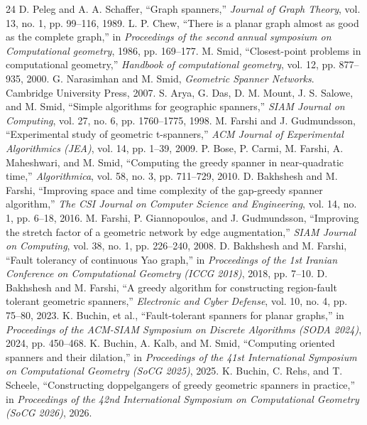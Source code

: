 \documentclass[journal]{IEEEtran}
\begin{document}
\begin{thebibliography}{24}
D. Peleg and A. A. Schaffer, ``Graph spanners,'' \textit{Journal of Graph Theory}, vol. 13, no. 1, pp. 99--116, 1989.
L. P. Chew, ``There is a planar graph almost as good as the complete graph,'' in \textit{Proceedings of the second annual symposium on Computational geometry}, 1986, pp. 169--177.
M. Smid, ``Closest-point problems in computational geometry,'' \textit{Handbook of computational geometry}, vol. 12, pp. 877--935, 2000.
G. Narasimhan and M. Smid, \textit{Geometric Spanner Networks}. Cambridge University Press, 2007.
S. Arya, G. Das, D. M. Mount, J. S. Salowe, and M. Smid, ``Simple algorithms for geographic spanners,'' \textit{SIAM Journal on Computing}, vol. 27, no. 6, pp. 1760--1775, 1998.
M. Farshi and J. Gudmundsson, ``Experimental study of geometric t-spanners,'' \textit{ACM Journal of Experimental Algorithmics (JEA)}, vol. 14, pp. 1--39, 2009.
P. Bose, P. Carmi, M. Farshi, A. Maheshwari, and M. Smid, ``Computing the greedy spanner in near-quadratic time,'' \textit{Algorithmica}, vol. 58, no. 3, pp. 711--729, 2010.
D. Bakhshesh and M. Farshi, ``Improving space and time complexity of the gap-greedy spanner algorithm,'' \textit{The CSI Journal on Computer Science and Engineering}, vol. 14, no. 1, pp. 6--18, 2016.
M. Farshi, P. Giannopoulos, and J. Gudmundsson, ``Improving the stretch factor of a geometric network by edge augmentation,'' \textit{SIAM Journal on Computing}, vol. 38, no. 1, pp. 226--240, 2008.
D. Bakhshesh and M. Farshi, ``Fault tolerancy of continuous Yao graph,'' in \textit{Proceedings of the 1st Iranian Conference on Computational Geometry (ICCG 2018)}, 2018, pp. 7--10.
D. Bakhshesh and M. Farshi, ``A greedy algorithm for constructing region-fault tolerant geometric spanners,'' \textit{Electronic and Cyber Defense}, vol. 10, no. 4, pp. 75--80, 2023.
K. Buchin, et al., ``Fault-tolerant spanners for planar graphs,'' in \textit{Proceedings of the ACM-SIAM Symposium on Discrete Algorithms (SODA 2024)}, 2024, pp. 450--468.
K. Buchin, A. Kalb, and M. Smid, ``Computing oriented spanners and their dilation,'' in \textit{Proceedings of the 41st International Symposium on Computational Geometry (SoCG 2025)}, 2025.
K. Buchin, C. Rehs, and T. Scheele, ``Constructing doppelgangers of greedy geometric spanners in practice,'' in \textit{Proceedings of the 42nd International Symposium on Computational Geometry (SoCG 2026)}, 2026.

\end{thebibliography}
\end{document}
